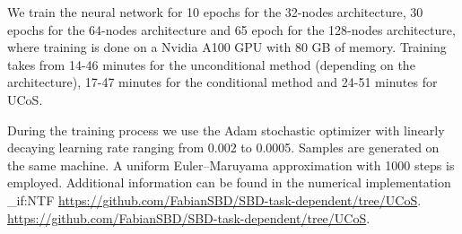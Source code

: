 \documentclass[10pt]{article} %
\def\Eqref#1{Equation~\ref{#1}}
\theoremstyle{plain}
\theoremstyle{definition}
\theoremstyle{remark}
\begin{document}
We train the neural network for 10 epochs for the 32-nodes architecture, 30 epochs for the 64-nodes architecture and 65 epoch for the 128-nodes architecture, where training is done on a Nvidia A100 GPU with 80 GB of memory. Training takes from 14-46 minutes for the unconditional method (depending on the architecture), 17-47 minutes for the conditional method and 24-51 minutes for UCoS.

During the training process we use the Adam stochastic optimizer with linearly decaying learning rate ranging from 0.002 to 0.0005. 
Samples are generated on the same machine.
A uniform Euler--Maruyama approximation with 1000 steps is employed. 
Additional information can be found in the numerical implementation \ExplSyntaxOn
\bool_if:NTF \accepted
    {\url{https://github.com/FabianSBD/SBD-task-dependent/tree/UCoS}.}
    {\url{https://github.com/FabianSBD/SBD-task-dependent/tree/UCoS}.}
\ExplSyntaxOff
\end{document}
